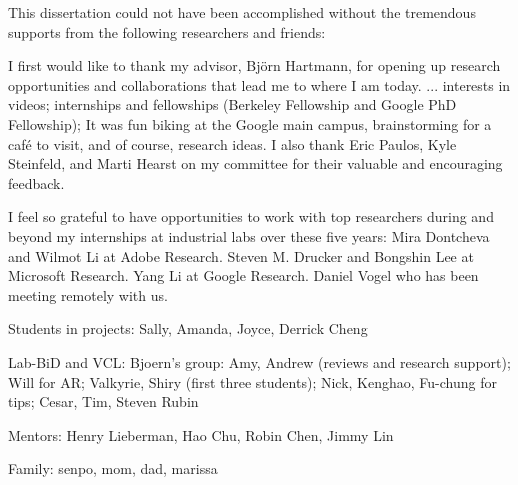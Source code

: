 \begin{acknowledgements}

This dissertation could not have been accomplished without the tremendous supports from the following researchers and friends:

I first would like to thank my advisor, Bj\"orn Hartmann, for opening up research opportunities and collaborations that lead me to where I am today.
%
... interests in videos; internships and fellowships (Berkeley Fellowship and Google PhD Fellowship);
%
It was fun biking at the Google main campus, brainstorming for a caf\'{e} to visit, and of course, research ideas.
%
I also thank Eric Paulos, Kyle Steinfeld, and Marti Hearst on my committee for their valuable and encouraging feedback.

I feel so grateful to have opportunities to work with top researchers during and beyond my internships at industrial labs over these five years: Mira Dontcheva and Wilmot Li at Adobe Research. Steven M. Drucker and Bongshin Lee at Microsoft Research. Yang Li at Google Research. Daniel Vogel who has been meeting remotely with us.

Students in projects: Sally, Amanda, Joyce, Derrick Cheng

Lab-BiD and VCL: Bjoern's group: Amy, Andrew (reviews and research support); Will for AR; Valkyrie, Shiry (first three students); Nick, Kenghao, Fu-chung for tips; Cesar, Tim, Steven Rubin

Mentors: Henry Lieberman, Hao Chu, Robin Chen, Jimmy Lin


Family: senpo, mom, dad, marissa



\end{acknowledgements}
